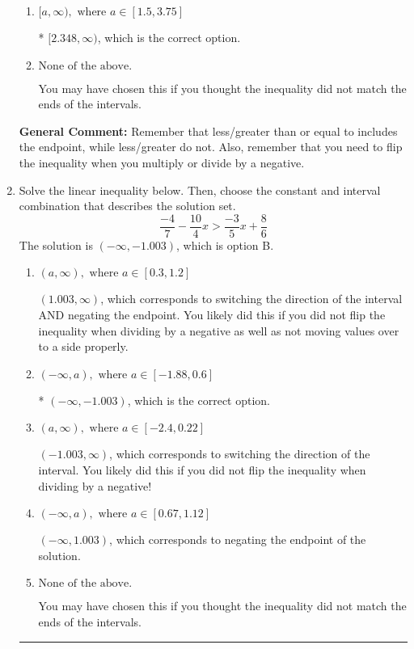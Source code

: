 \documentclass{extbook}[14pt]
\newcommand{\litem}[1]{\item #1

\rule{\textwidth}{0.4pt}}
\begin{document}
\begin{enumerate}
{\begin{enumerate}[label=\Alph*.]
 $(-\infty, -2.348]$, which corresponds to switching the direction of the interval AND negating the endpoint. You likely did this if you did not flip the inequality when dividing by a negative as well as not moving values over to a side properly.
\item \( [a, \infty), \text{ where } a \in [1.5, 3.75] \)

* $[2.348, \infty)$, which is the correct option.
\item \( \text{None of the above}. \)

You may have chosen this if you thought the inequality did not match the ends of the intervals.
\end{enumerate}

\textbf{General Comment:} Remember that less/greater than or equal to includes the endpoint, while less/greater do not. Also, remember that you need to flip the inequality when you multiply or divide by a negative.
}
\litem{
Solve the linear inequality below. Then, choose the constant and interval combination that describes the solution set.
\[ \frac{-4}{7} - \frac{10}{4} x > \frac{-3}{5} x + \frac{8}{6} \]The solution is \( (-\infty, -1.003) \), which is option B.\begin{enumerate}[label=\Alph*.]
\item \( (a, \infty), \text{ where } a \in [0.3, 1.2] \)

 $(1.003, \infty)$, which corresponds to switching the direction of the interval AND negating the endpoint. You likely did this if you did not flip the inequality when dividing by a negative as well as not moving values over to a side properly.
\item \( (-\infty, a), \text{ where } a \in [-1.88, 0.6] \)

* $(-\infty, -1.003)$, which is the correct option.
\item \( (a, \infty), \text{ where } a \in [-2.4, 0.22] \)

 $(-1.003, \infty)$, which corresponds to switching the direction of the interval. You likely did this if you did not flip the inequality when dividing by a negative!
\item \( (-\infty, a), \text{ where } a \in [0.67, 1.12] \)

 $(-\infty, 1.003)$, which corresponds to negating the endpoint of the solution.
\item \( \text{None of the above}. \)

You may have chosen this if you thought the inequality did not match the ends of the intervals.
\end{enumerate}

}
\end{enumerate}
\end{document}
